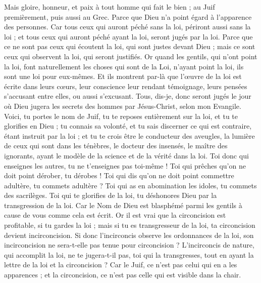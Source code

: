 \begin{multicols}{2}
Mais gloire, honneur, et paix à tout homme qui fait le bien ; au Juif premièrement, puis aussi au Grec.
Parce que Dieu n'a point égard à l'apparence des personnes.
Car tous ceux qui auront péché sans la loi, périront aussi sans la loi ; et tous ceux qui auront péché ayant la loi, seront jugés par la loi.
Parce que ce ne sont pas ceux qui écoutent la loi, qui sont justes devant Dieu ; mais ce sont ceux qui observent la loi, qui seront justifiés.
Or quand les gentils, qui n'ont point la loi, font naturellement les choses qui sont de la Loi, n'ayant point la loi, ils sont une loi pour eux-mêmes.
Et ils montrent par-là que l’œuvre de la loi est écrite dans leurs cœurs, leur conscience leur rendant témoignage, leurs pensées s’accusant entre elles, ou aussi s’excusant.
Tous, dis-je, donc seront jugés le jour où Dieu jugera les secrets des hommes par Jésus-Christ, selon mon Evangile.
Voici, tu portes le nom de Juif, tu te reposes entièrement sur la loi, et tu te glorifies en Dieu ;
tu connais sa volonté, et tu sais discerner ce qui est contraire, étant instruit par la loi ; 
et tu te crois être le conducteur des aveugles, la lumière de ceux qui sont dans les ténèbres,
le docteur des insensés, le maître des ignorants, ayant le modèle de la science et de la vérité dans la loi.
Toi donc qui enseignes les autres, tu ne t’enseignes pas toi-même ! Toi qui prêches qu’on ne doit point dérober, tu dérobes !
Toi qui dis qu’on ne doit point commettre adultère, tu commets adultère ? Toi qui as en abomination les idoles, tu commets des sacrilèges.
Toi qui te glorifies de la loi, tu déshonores Dieu par la transgression de la loi.
Car le Nom de Dieu est blasphémé parmi les gentils à cause de vous comme cela est écrit.
Or il est vrai que la circoncision est profitable, si tu gardes la loi ; mais si tu es transgresseur de la loi, ta circoncision devient incirconcision.
Si donc l’incirconcis observe les ordonnances de la loi, son incirconcision ne sera-t-elle pas tenue pour circoncision ?
L’incirconcis de nature, qui accomplit la loi, ne te jugera-t-il pas, toi qui la transgresses, tout en ayant la lettre de la loi et la circoncision ?
Car le Juif, ce n'est pas celui qui en a les apparences ; et la circoncision, ce n’est pas celle qui est visible dans la chair.

\end{multicols}

